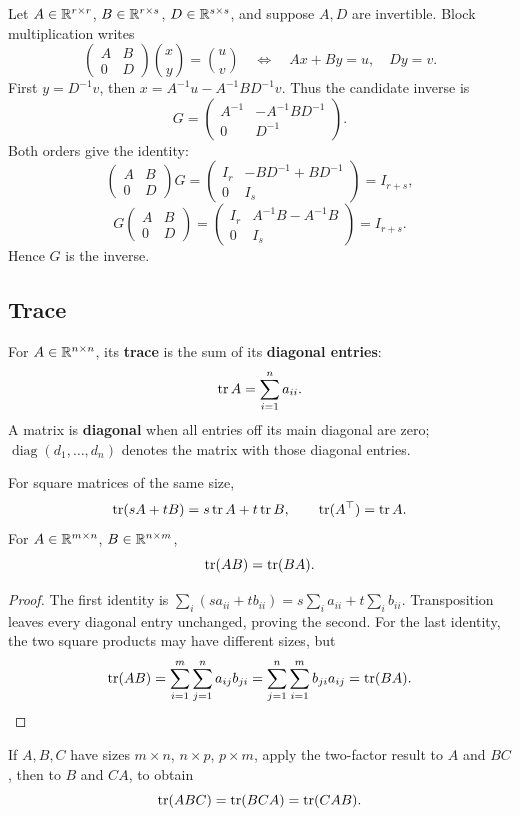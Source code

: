 \begin{example}\label{example:02:block}
Let \(A\in\mathbb R^{r\times r}\), \(B\in\mathbb R^{r\times s}\),
\(D\in\mathbb R^{s\times s}\), and suppose \(A,D\) are invertible.
Block multiplication writes
\[
\begin{pmatrix}A&B\\0&D\end{pmatrix}\binom{x}{y}=\binom{u}{v}
\quad\Longleftrightarrow\quad
Ax+By=u,\quad Dy=v.
\]
First \(y=D^{-1}v\), then \(x=A^{-1}u-A^{-1}BD^{-1}v\).
Thus the candidate inverse is
\[
G=\begin{pmatrix}A^{-1}&-A^{-1}BD^{-1}\\0&D^{-1}\end{pmatrix}.
\]
Both orders give the identity:
\[
\begin{pmatrix}A&B\\0&D\end{pmatrix}G
=\begin{pmatrix}I_r&-BD^{-1}+BD^{-1}\\0&I_s\end{pmatrix}=I_{r+s},
\]
\[
G\begin{pmatrix}A&B\\0&D\end{pmatrix}
=\begin{pmatrix}I_r&A^{-1}B-A^{-1}B\\0&I_s\end{pmatrix}=I_{r+s}.
\]
Hence \(G\) is the inverse.
\end{example}

\subsection*{Trace}
For \(A\in\mathbb R^{n\times n}\), its \textbf{trace} is the sum of its
\textbf{diagonal entries}:
\[
\operatorname{tr} A=\sum_{i=1}^n a_{ii}.
\]
A matrix is \textbf{diagonal} when all entries off its main diagonal
are zero; \(\operatorname{diag}(d_1,\ldots,d_n)\) denotes the matrix
with those diagonal entries.

\begin{proposition}\label{prop:02:trace}
For square matrices of the same size,
\[
\operatorname{tr}(sA+tB)=s\operatorname{tr} A+t\operatorname{tr} B,\qquad \operatorname{tr}(A^\top)=\operatorname{tr} A.
\]
For \(A\in\mathbb R^{m\times n}\), \(B\in\mathbb R^{n\times m}\),
\[
\operatorname{tr}(AB)=\operatorname{tr}(BA).
\]
\end{proposition}
\begin{proof}
The first identity is \(\sum_i(sa_{ii}+tb_{ii})=s\sum_i a_{ii}+t\sum_i b_{ii}\).
Transposition leaves every diagonal entry unchanged, proving the second.
For the last identity, the two square products may have different sizes,
but
\[
\operatorname{tr}(AB)=\sum_{i=1}^m\sum_{j=1}^n a_{ij}b_{ji}
=\sum_{j=1}^n\sum_{i=1}^m b_{ji}a_{ij}=\operatorname{tr}(BA).
\]
\end{proof}
If \(A,B,C\) have sizes \(m\times n\), \(n\times p\), \(p\times m\),
apply the two-factor result to \(A\) and \(BC\), then to \(B\) and \(CA\),
to obtain
\[
\operatorname{tr}(ABC)=\operatorname{tr}(BCA)=\operatorname{tr}(CAB).
\]

